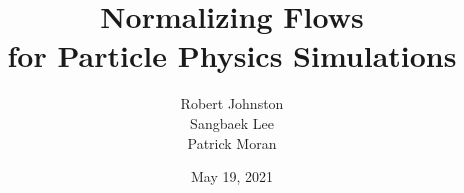 \documentclass[aspectratio=169]{beamer}
\title{Normalizing Flows\texorpdfstring{\\}{,} for Particle Physics Simulations}
\institute{MIT 6.862 Team 3\\Laboratory for Nuclear Science}%
\author{Robert Johnston\texorpdfstring{\\}{,} Sangbaek Lee\texorpdfstring{\\}{,} Patrick Moran}%
\date{May 19, 2021}
\begin{document}
\begin{frame}
    \maketitle
\end{frame}





                
            
                
\end{document}
